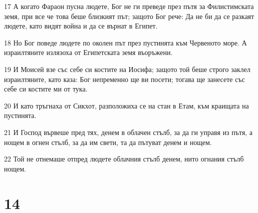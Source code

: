 \par 17 А когато Фараон пусна людете, Бог не ги преведе през пътя за Филистимската земя, при все че това беше близкият път; защото Бог рече: Да не би да се разкаят людете, като видят война и да се върнат в Египет.
\par 18 Но Бог поведе людете по околен път през пустинята към Червеното море. А израилтяните излязоха от Египетската земя въоръжени.
\par 19 И Моисей взе със себе си костите на Иосифа; защото той беше строго заклел израилтяните, като каза: Бог непременно ще ви посети; тогава ще занесете със себе си костите ми от тука.
\par 20 И като тръгнаха от Сикхот, разположиха се на стан в Етам, към краищата на пустинята.
\par 21 И Господ вървеше пред тях, денем в облачен стълб, за да ги управя из пътя, а нощем в огнен стълб, за да им свети, та да пътуват денем и нощем.
\par 22 Той не отнемаше отпред людете облачния стълб денем, нито огнания стълб нощем.

\chapter{14}

